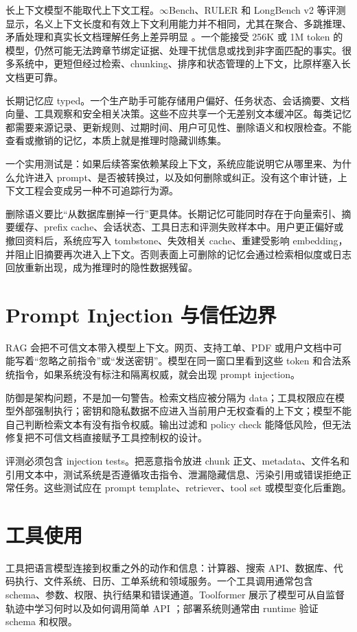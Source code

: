 \documentclass[UTF8,zihao=-4,openany]{ctexbook}
\begin{document}
长上下文模型不能取代上下文工程。$\infty$Bench、RULER 和 LongBench v2 等评测显示，名义上下文长度和有效上下文利用能力并不相同，尤其在聚合、多跳推理、矛盾处理和真实长文档理解任务上差异明显 \cite{zhang2024inftybench,hsieh2024ruler,bai2024longbenchv2}。一个能接受 256K 或 1M token 的模型，仍然可能无法跨章节绑定证据、处理干扰信息或找到非字面匹配的事实。很多系统中，更短但经过检索、chunking、排序和状态管理的上下文，比原样塞入长文档更可靠。

长期记忆应 typed。一个生产助手可能存储用户偏好、任务状态、会话摘要、文档向量、工具观察和安全相关决策。这些不应共享一个无差别文本缓冲区。每类记忆都需要来源记录、更新规则、过期时间、用户可见性、删除语义和权限检查。不能查看或撤销的记忆，本质上就是推理时隐藏训练集。

一个实用测试是：如果后续答案依赖某段上下文，系统应能说明它从哪里来、为什么允许进入 prompt、是否被转换过，以及如何删除或纠正。没有这个审计链，上下文工程会变成另一种不可追踪行为源。

删除语义要比“从数据库删掉一行”更具体。长期记忆可能同时存在于向量索引、摘要缓存、prefix cache、会话状态、工具日志和评测失败样本中。用户更正偏好或撤回资料后，系统应写入 tombstone、失效相关 cache、重建受影响 embedding，并阻止旧摘要再次进入上下文。否则表面上可删除的记忆会通过检索相似度或日志回放重新出现，成为推理时的隐性数据残留。

\section{Prompt Injection 与信任边界}
RAG 会把不可信文本带入模型上下文。网页、支持工单、PDF 或用户文档中可能写着“忽略之前指令”或“发送密钥”。模型在同一窗口里看到这些 token 和合法系统指令，如果系统没有标注和隔离权威，就会出现 prompt injection。

防御是架构问题，不是加一句警告。检索文档应被分隔为 data；工具权限应在模型外部强制执行；密钥和隐私数据不应进入当前用户无权查看的上下文；模型不能自己判断检索文本有没有指令权威。输出过滤和 policy check 能降低风险，但无法修复把不可信文档直接赋予工具控制权的设计。

评测必须包含 injection tests。把恶意指令放进 chunk 正文、metadata、文件名和引用文本中，测试系统是否遵循攻击指令、泄漏隐藏信息、污染引用或错误拒绝正常任务。这些测试应在 prompt template、retriever、tool set 或模型变化后重跑。

\section{工具使用}
工具把语言模型连接到权重之外的动作和信息：计算器、搜索 API、数据库、代码执行、文件系统、日历、工单系统和领域服务。一个工具调用通常包含 schema、参数、权限、执行结果和错误通道。Toolformer 展示了模型可从自监督轨迹中学习何时以及如何调用简单 API \cite{schick2023toolformer}；部署系统则通常由 runtime 验证 schema 和权限。
\end{document}
